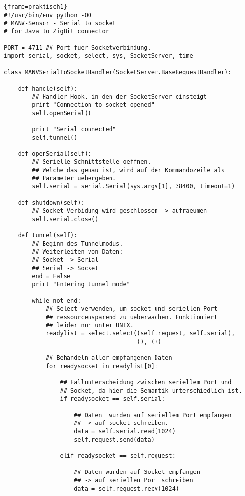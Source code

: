 \begin{lstlisting}{frame=praktisch1}
#!/usr/bin/env python -OO
# MANV-Sensor - Serial to socket
# for Java to ZigBit connector 

PORT = 4711 ## Port fuer Socketverbindung.
import serial, socket, select, sys, SocketServer, time

class MANVSerialToSocketHandler(SocketServer.BaseRequestHandler):

    def handle(self):
        ## Handler-Hook, in den der SocketServer einsteigt
        print "Connection to socket opened"
        self.openSerial()

        print "Serial connected"
        self.tunnel()

    def openSerial(self):
        ## Serielle Schnittstelle oeffnen.
        ## Welche das genau ist, wird auf der Kommandozeile als 
        ## Parameter uebergeben.
        self.serial = serial.Serial(sys.argv[1], 38400, timeout=1)

    def shutdown(self):
        ## Socket-Verbidung wird geschlossen -> aufraeumen
        self.serial.close()

    def tunnel(self):
        ## Beginn des Tunnelmodus.
        ## Weiterleiten von Daten:
        ## Socket -> Serial
        ## Serial -> Socket
        end = False
        print "Entering tunnel mode"

        while not end:
            ## Select verwenden, um socket und seriellen Port 
            ## ressourcensparend zu ueberwachen. Funktioniert
            ## leider nur unter UNIX.
            readylist = select.select((self.request, self.serial),
                                      (), ())

            ## Behandeln aller empfangenen Daten
            for readysocket in readylist[0]:

                ## Fallunterscheidung zwischen seriellem Port und 
                ## Socket, da hier die Semantik unterschiedlich ist.
                if readysocket == self.serial:

                    ## Daten  wurden auf seriellem Port empfangen
                    ## -> auf socket schreiben.
                    data = self.serial.read(1024)
                    self.request.send(data)

                elif readysocket == self.request:

                    ## Daten wurden auf Socket empfangen
                    ## -> auf seriellen Port schreiben
                    data = self.request.recv(1024)


\end{lstlisting}
